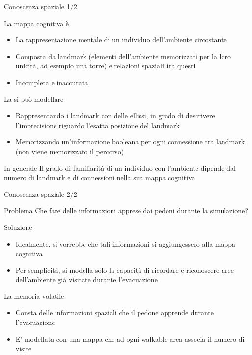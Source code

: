 \documentclass{beamer}
\begin{document}
\begin{frame}{Conoscenza spaziale 1/2}
\begin{block}{La mappa cognitiva è}
\begin{itemize}
    \item La rappresentazione mentale di un individuo dell’ambiente circostante
    \item Composta da \textcolor{bostonuniversityred}{landmark} (elementi dell'ambiente memorizzati per la loro unicità, ad esempio una torre) e relazioni spaziali tra questi %
    \item Incompleta e inaccurata
\end{itemize}{}
\end{block}{}
\begin{block}{La si può modellare}
\begin{itemize}
    \item Rappresentando i landmark con delle \textcolor{bostonuniversityred}{ellissi}, in grado di descrivere l'imprecisione riguardo l'esatta posizione del landmark
    \item Memorizzando un'informazione booleana per ogni connessione tra landmark (non viene memorizzato il percorso)
\end{itemize}
\end{block}
\begin{block}{In generale}
Il grado di familiarità di un individuo con l'ambiente dipende dal numero di landmark e di connessioni nella sua mappa cognitiva
\end{block}{}
\end{frame}{}

\begin{frame}{Conoscenza spaziale 2/2}
\begin{alertblock}{Problema}
Che fare delle informazioni apprese dai pedoni durante la simulazione?
\end{alertblock}
\begin{block}{Soluzione}
\begin{itemize}
    \item Idealmente, si vorrebbe che tali informazioni si aggiungessero alla mappa cognitiva
    \item Per semplicità, si modella solo la capacità di ricordare e riconoscere aree dell'ambiente già visitate durante l'evacuazione
\end{itemize}
\end{block}
\begin{block}{La memoria volatile}
\begin{itemize}
    \item Consta delle informazioni spaziali che il pedone apprende durante l’evacuazione
    \item E' modellata con una mappa che ad ogni walkable area associa il numero di visite
\end{itemize}{}
\end{block}{}
\end{frame}
\end{document}
